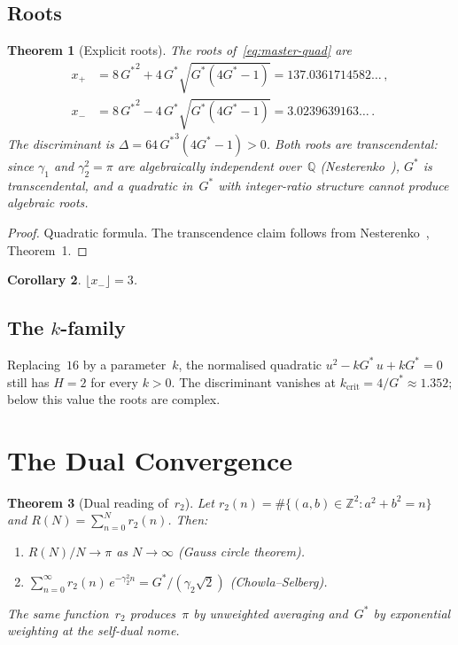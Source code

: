 \documentclass[12pt,reqno]{amsart}
\newtheorem{theorem}{Theorem}[section]
\newtheorem{corollary}[theorem]{Corollary}
\theoremstyle{definition}
\theoremstyle{remark}
\newcommand{\ZZ}{\mathbb{Z}}
\newcommand{\QQ}{\mathbb{Q}}
\newcommand{\Gstar}{G^{\!*}}
\begin{document}
\subsection{Roots}\label{ssec:roots}

\begin{theorem}[Explicit roots]\label{thm:roots}
The roots of~\eqref{eq:master-quad} are
\begin{align}
  x_{+} &= 8\,{{\Gstar}}^{2} + 4\,\Gstar\sqrt{\Gstar(4\Gstar-1)}
  = 137.0361714582\ldots\,,\label{eq:xp}\\[3pt]
  x_{-} &= 8\,{{\Gstar}}^{2} - 4\,\Gstar\sqrt{\Gstar(4\Gstar-1)}
  = 3.0239639163\ldots\,.\label{eq:xm}
\end{align}
The discriminant is $\Delta = 64\,{{\Gstar}}^{3}(4\Gstar-1)>0$.
Both roots are transcendental: since $\gamma_{1}$ and
$\gamma_{2}^{2}=\pi$ are algebraically independent over~$\QQ$
\textup{(Nesterenko~\cite{Nesterenko})}, $\Gstar$ is transcendental, and a
quadratic in~$\Gstar$ with integer-ratio structure cannot produce algebraic
roots.
\end{theorem}

\begin{proof}
Quadratic formula.  The transcendence claim follows from
Nesterenko~\cite{Nesterenko}, Theorem~1.
\end{proof}

\begin{corollary}\label{cor:floor}
$\lfloor x_{-}\rfloor = 3$.
\end{corollary}

\subsection{The \texorpdfstring{$k$}{k}-family}\label{ssec:kfamily}

Replacing~$16$ by a parameter~$k$, the normalised quadratic
$u^{2} - k\Gstar\,u + k\Gstar = 0$
still has $H=2$ for every $k>0$.  The discriminant vanishes at
$k_{\mathrm{crit}} = 4/\Gstar \approx 1.352$; below this value the roots are
complex.


\section{The Dual Convergence}\label{sec:dual}

\begin{theorem}[Dual reading of~$r_{2}$]\label{thm:dual}
Let $r_{2}(n) = \#\{(a,b)\in\ZZ^{2}: a^{2}+b^{2}=n\}$ and
$R(N)=\sum_{n=0}^{N}r_{2}(n)$.  Then:
\begin{enumerate}[label=\textup{(\roman*)}]
  \item $R(N)/N \to \pi$ as $N\to\infty$
    \quad \textup{(Gauss circle theorem)}.
  \item $\sum_{n=0}^{\infty}r_{2}(n)\,e^{-\gamma_{2}^{2}n}
    = \Gstar/(\gamma_{2}\sqrt{2})$
    \quad \textup{(Chowla--Selberg)}.
\end{enumerate}
The same function~$r_{2}$ produces~$\pi$ by unweighted averaging and~$\Gstar$
by exponential weighting at the self-dual nome.
\end{theorem}
\end{document}
